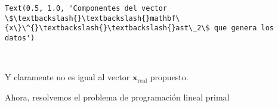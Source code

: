 \documentclass[11pt]{article}
\makeatletter
\newcommand{\boxspacing}{\kern\kvtcb@left@rule\kern\kvtcb@boxsep}
\newcommand{\prompt}[4]{
        {\ttfamily\llap{{\color{#2}[#3]:\hspace{3pt}#4}}\vspace{-\baselineskip}}
    }
\makeatother
\begin{document}
            \begin{tcolorbox}[breakable, size=fbox, boxrule=.5pt, pad at break*=1mm, opacityfill=0]
\prompt{Out}{outcolor}{5}{\boxspacing}
\begin{Verbatim}[commandchars=\\\{\}]
Text(0.5, 1.0, 'Componentes del vector \$\textbackslash{}\textbackslash{}mathbf\{x\}\^{}\textbackslash{}\textbackslash{}ast\_2\$ que genera los
datos')
\end{Verbatim}
\end{tcolorbox}
        
    \begin{center}
    \end{center}
    { \hspace*{\fill} \\}
    
    Y claramente no es igual al vector \(\mathbf{x}_{\mathrm{real}}\)
propuesto.

    Ahora, resolvemos el problema de programación lineal primal
\end{document}
